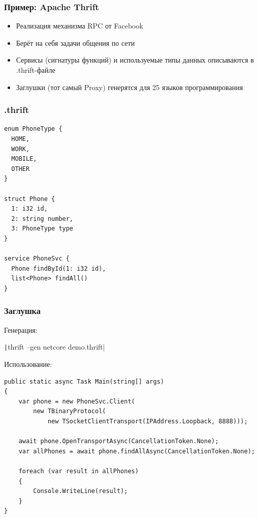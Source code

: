 \documentclass[xetex,mathserif,serif]{beamer}
\begin{document}
    \begin{frame}
        \frametitle{Пример: Apache Thrift}
        \begin{itemize}
            \item Реализация механизма RPC от Facebook
            \item Берёт на себя задачи общения по сети
            \item Сервисы (сигнатуры функций) и используемые типы данных описываются в .thrift-файле
            \item Заглушки (тот самый Proxy) генерятся для 25 языков программирования
        \end{itemize}
    \end{frame}

    \begin{frame}[fragile]
        \frametitle{.thrift}
        \begin{small}
            \begin{verbatim}
enum PhoneType {
  HOME,
  WORK,
  MOBILE,
  OTHER
}

struct Phone {
  1: i32 id,
  2: string number,
  3: PhoneType type
}

service PhoneSvc {
  Phone findById(1: i32 id),
  list<Phone> findAll()
}
            \end{verbatim}
        \end{small}
    \end{frame}

    \begin{frame}[fragile]
        \frametitle{Заглушка}
        \begin{small}
            Генерация:

            \texttt|thrift --gen netcore demo.thrift|

            \vspace{3mm}

            Использование:
        \begin{verbatim}
public static async Task Main(string[] args)
{
    var phone = new PhoneSvc.Client(
        new TBinaryProtocol(
            new TSocketClientTransport(IPAddress.Loopback, 8888)));

    await phone.OpenTransportAsync(CancellationToken.None);
    var allPhones = await phone.findAllAsync(CancellationToken.None);

    foreach (var result in allPhones)
    {
        Console.WriteLine(result);
    }
}
            \end{verbatim}
        \end{small}
    \end{frame}
\end{document}
